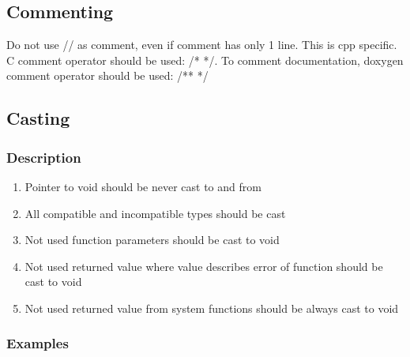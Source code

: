 \subsection{Commenting}
Do not use // as comment, even if comment has only 1 line. This is cpp specific. C comment operator should be used: /* */. To comment documentation, doxygen comment operator should be used: /** */

\subsection{Casting}

\subsubsection{Description}

\begin{enumerate}
    \item Pointer to void should be never cast to and from
    \item All compatible and incompatible types should be cast
    \item Not used function parameters should be cast to void
    \item Not used returned value where value describes error of function should be cast to void
    \item Not used returned value from system functions should be always cast to void
\end{enumerate}

\subsubsection{Examples}


